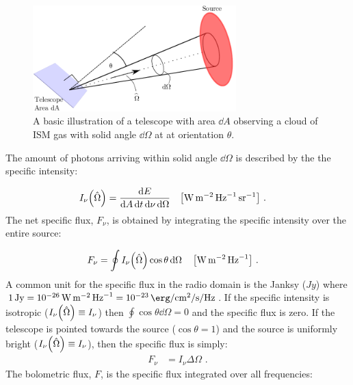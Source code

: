 \begin{figure}
	\centering
	\includegraphics[width=0.7\textwidth]{06_Interstellar_Medium/Images/Theory/intensity.pdf}
	\caption{A basic illustration of a telescope with area $\dd{A}$ observing a cloud of ISM gas with solid angle $\dd{\Omega}$ at at orientation $\theta$.}
	\label{fig:telescope_basic_diagram2}
\end{figure}
\noindent The amount of photons arriving within solid angle $\dd{\Omega}$ is described by the the specific intensity:

\begin{equation}
	\begin{aligned}
		I_\nu\qty(\hat{\Omega})&=\frac{\dd{E}}{\dd{A}\dd{t}\dd{\nu}\dd{\Omega}}\quad\qty[\si{\watt\per\meter\squared\per\hertz\per\steradian}]\text{ .}
	\end{aligned}
\end{equation}
\newpar 
\noindent The net specific flux, $F_\nu$, is obtained by integrating the specific intensity over the entire source:

\begin{equation}
	\begin{aligned}
		F_\nu &=\oint I_\nu\qty(\hat{\Omega})\cos\theta\dd{\Omega}\quad\qty[\si{\watt\per\meter\squared\per\hertz}]\text{ .}
	\end{aligned}
\end{equation}
\noindent A common unit for the specific flux in the radio domain is the Janksy ($\si{Jy}$) where $1\,\si{Jy}=10^{-26}\,\si{\watt\per\meter\squared\per\hertz} = 10^{-23}\,\si{\erg\per\centi\meter\squared\per\second\per\hertz}$. If the specific intensity is isotropic ($I_\nu\qty(\hat{\Omega})\equiv I_\nu$) then $\oint \cos\theta\dd{\Omega}=0$ and the specific flux is zero. If the telescope is pointed towards the source ($\cos\theta=1$) and the source is uniformly bright ($I_\nu\qty(\hat{\Omega})\equiv I_\nu$), then the specific flux is simply:
\begin{equation}
	\begin{aligned}
		F_\nu&=I_\nu\Delta\Omega\text{ .}
	\end{aligned}\label{eq:specifc_flux_uniform_source}
\end{equation}
\noindent The bolometric flux, $F$, is the specific flux integrated over all frequencies:

